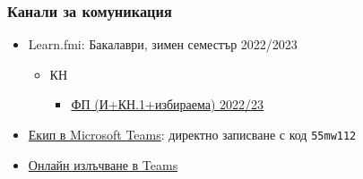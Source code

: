 \documentclass[alsotrans]{beamerswitch}
\begin{document}
\begin{frame}
  \frametitle{Канали за комуникация}
  \begin{itemize}
  \item Learn.fmi: Бакалаври, зимен семестър 2022/2023
    \begin{itemize}
    \item КН
      \begin{itemize}
      \item \href{https://learn.fmi.uni-sofia.bg/course/view.php?id=8511}{ФП (И+КН.1+избираема) 2022/23}
      \end{itemize}
    \end{itemize}
  \item \href{https://teams.microsoft.com/l/team/19\%3aHQ7tgY-jwkkgn576tS_OOxMmThKQZCrw2LAYPBp1-CY1\%40thread.tacv2/conversations?groupId=987fa2ef-44f7-4431-8257-50082ba3267d&tenantId=9d05c5fb-e448-4700-8a58-e15b93c84ea9}{Екип в Microsoft Teams}: директно записване с код \tt{55mw112}
  \item \href{https://teams.microsoft.com/l/meetup-join/19\%3aHQ7tgY-jwkkgn576tS_OOxMmThKQZCrw2LAYPBp1-CY1\%40thread.tacv2/1664737465880?context=\%7b\%22Tid\%22\%3a\%229d05c5fb-e448-4700-8a58-e15b93c84ea9\%22\%2c\%22Oid\%22\%3a\%227354cd98-c695-434c-afd6-2d519f48fa53\%22\%7d}{Онлайн излъчване в Teams}
  \end{itemize}
\end{frame}
\end{document}
